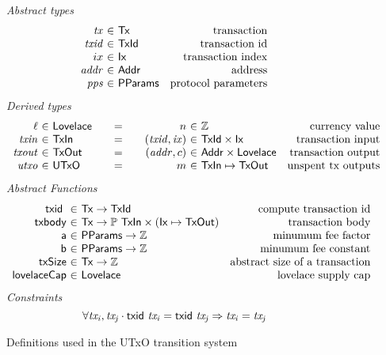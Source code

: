 \begin{figure*}[htb]
  \emph{Abstract types}
  \begin{equation*}
    \begin{array}{r@{~\in~}lr}
      \var{tx} & \Tx & \text{transaction}\\
      \var{txid} & \TxId & \text{transaction id}\\
      ix & \Ix & \text{transaction index}\\
      \var{addr} & \Addr & \text{address}\\
      \var{pps} & \PPMMap & \text{protocol parameters}
    \end{array}
  \end{equation*}
  \emph{Derived types}
  \begin{equation*}
    \begin{array}{r@{~\in~}l@{\qquad=\qquad}r@{~\in~}lr}
      \ell & \Lovelace
      & n  & \mathbb{Z}
      & \text{currency value}
      \\
      \var{txin}
      & \TxIn
      & (\var{txid}, \var{ix})
      & \TxId \times \Ix
      & \text{transaction input}
      \\
      \var{txout}
      & \type{TxOut}
      & (\var{addr}, c)
      & \Addr \times \Lovelace
      & \text{transaction output}
      \\
      \var{utxo}
      & \UTxO
      & m
      & \TxIn \mapsto \TxOut
      & \text{unspent tx outputs}
    \end{array}
  \end{equation*}
  \emph{Abstract Functions}
  \begin{equation*}
    \begin{array}{r@{~\in~}lr}
      \txid{} & \Tx \to \TxId & \text{compute transaction id}\\
      \fun{txbody} & \Tx \to \powerset{\TxIn} \times (\Ix \mapsto \TxOut)
                                  & \text{transaction body}\\
      \fun{a} & \PPMMap \to \mathbb{Z} & \text{minumum fee factor}\\
      \fun{b} & \PPMMap \to \mathbb{Z} & \text{minumum fee constant}\\
      \fun{txSize} & \Tx \to \mathbb{Z} & \text{abstract size of a transaction}\\
      \fun{lovelaceCap} & \Lovelace & \text{lovelace supply cap}
    \end{array}
  \end{equation*}
  \emph{Constraints}
  \begin{equation}
    \label{eq:txid-injective}
    \forall \mathit{tx_i}, \mathit{tx_j} \cdot
    \mathsf{txid}~ \mathit{\mathit{tx_i}} = \mathsf{txid}~ \mathit{\mathit{tx_j}} \Rightarrow \mathit{tx_i} = \mathit{tx_j}
  \end{equation}
  \caption{Definitions used in the UTxO transition system}
  \label{fig:defs:utxo}
\end{figure*}

